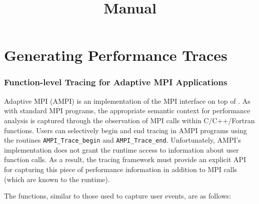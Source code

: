 \documentclass[10pt]{report}
\title{\projections{} Manual}
\begin{document}
\maketitle

\chapter{Generating Performance Traces}



\subsection{Function-level Tracing for Adaptive MPI Applications}
\label{sec::AMPI functions}

Adaptive MPI (AMPI) is an implementation of the MPI interface on top
of \charmpp{}. As with standard MPI programs, the appropriate semantic
context for performance analysis is captured through the observation
of MPI calls within C/C++/Fortran functions. Users can selectively begin
and end tracing in AMPI programs using the routines \texttt{AMPI\_Trace\_begin}
and \texttt{AMPI\_Trace\_end}. Unfortunately, AMPI's
implementation does not grant the runtime access to information about
user function calls. As a result, the tracing framework must provide
an explicit API for capturing this piece of performance information in
addition to MPI calls (which are known to the runtime).

The functions, similar to those used to capture user events, are as
follows:
\end{document}
